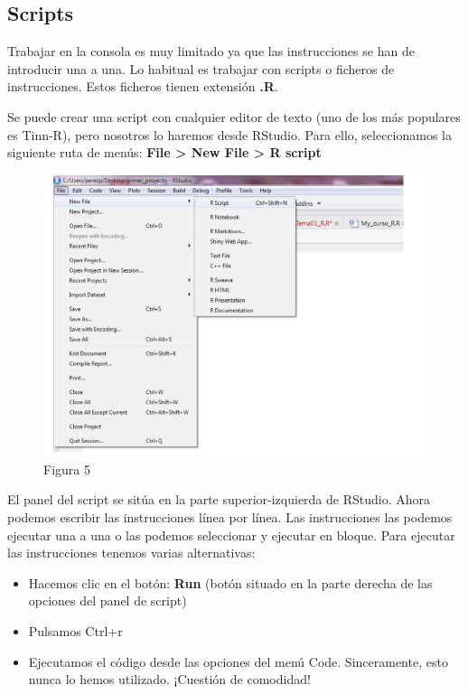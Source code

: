 \documentclass[
]{book}
\begin{document}
\hypertarget{scripts}{%
\subsection{Scripts}\label{scripts}}

Trabajar en la consola es muy limitado ya que las instrucciones se han de introducir una a una. Lo habitual es trabajar con scripts o ficheros de instrucciones. Estos ficheros tienen extensión \textbf{.R}.

Se puede crear una script con cualquier editor de texto (uno de los más populares es Tinn-R), pero nosotros lo haremos desde RStudio. Para ello, seleccionamos la siguiente ruta de menús: \textbf{File \textgreater{} New File \textgreater{} R script}

\begin{figure}
\centering
\includegraphics{imagenes/06.png}
\caption{Figura 5}
\end{figure}

El panel del script se sitúa en la parte superior-izquierda de RStudio. Ahora podemos escribir las instrucciones línea por línea. Las instrucciones las podemos ejecutar una a una o las podemos seleccionar y ejecutar en bloque. Para ejecutar las instrucciones tenemos varias alternativas:

\begin{itemize}
\item
  Hacemos clic en el botón: \textbf{Run} (botón situado en la parte derecha de las opciones del panel de script)
\item
  Pulsamos Ctrl+r
\item
  Ejecutamos el código desde las opciones del menú Code. Sinceramente, esto nunca lo hemos utilizado. ¡Cuestión de comodidad!
\end{itemize}
\end{document}
